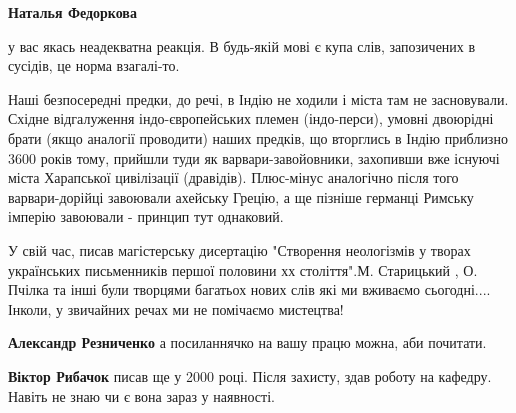 \begin{itemize}
\begin{itemize}
 
\textbf{Наталья Федоркова} 

у вас якась неадекватна реакція. В будь-якій мові є купа слів, запозичених в
сусідів, це норма взагалі-то.

Наші безпосередні предки, до речі, в Індію не ходили і міста там не
засновували. Східне відгалуження індо-європейських племен (індо-перси), умовні
двоюрідні брати (якщо аналогії проводити) наших предків, що вторглись в Індію
приблизно 3600 років тому, прийшли туди як варвари-завойовники, захопивши вже
існуючі міста Харапської цивілізації (дравідів). Плюс-мінус аналогічно після
того варвари-дорійці завоювали ахейську Грецію, а ще пізніше германці Римську
імперію завоювали - принцип тут однаковий.

\end{itemize}

 

У свій час, писав магістерську дисертацію "Створення неологізмів у творах
українських письменників першої половини хх століття".М. Старицький , О. Пчілка
та інші були творцями багатьох нових слів які ми вживаємо сьогодні.... Інколи, у
звичайних речах ми не помічаємо мистецтва!

\begin{itemize}
 
\textbf{Александр Резниченко} а посиланнячко на вашу працю можна, аби почитати.

 
\textbf{Віктор Рибачок} писав ще у 2000 році. Після захисту, здав роботу на кафедру. Навіть не знаю чи є вона зараз у наявності.


\end{itemize}
\end{itemize}
